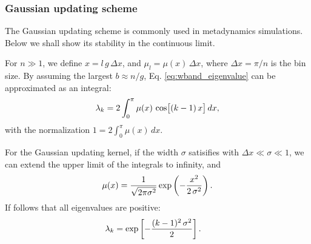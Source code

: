 \documentclass[reprint, floatfix]{revtex4-1}
\begin{document}
\subsubsection{Gaussian updating scheme}



The Gaussian updating scheme is commonly
used in metadynamics simulations.
%
Below we shall show its stability
in the continuous limit.



For $n \gg 1$,
we define
$x = l \, g \, \Delta x$,
and
$\mu_l = \mu(x) \, \Delta x$,
where
$\Delta x = \pi/n$
is the bin size.
%
By assuming the largest $b \approx n/g$,
Eq. \eqref{eq:wband_eigenvalue}
can be approximated as an integral:
%
\begin{equation}
  \lambda_k
  =
  2 \int_0^\pi
    \mu(x) \, \cos \bigl[ (k-1) \, x \bigr] \, dx,
\notag
\end{equation}
%
with the normalization
%
$
  1 = 2 \int_0^\pi \mu(x) \, dx.
$


For the Gaussian updating kernel,
if the width $\sigma$ satisifies
with $\Delta x \ll \sigma \ll 1$,
we can extend
the upper limit of the integrals
to infinity, and
%
\begin{equation}
  \mu(x)
  =
  \frac{            1            }
       { \sqrt{ 2 \pi \sigma^2 } }
  \exp\left(
        -\frac{       x^2     }
              { 2 \, \sigma^2 }
      \right)
  .
\notag
\end{equation}
%
%
If follows that all eigenvalues are positive:
%
\begin{align}
  \lambda_k
  &=
  \exp\left[
        -\frac{ (k - 1)^2 \, \sigma^2 }
              {           2           }
      \right]
  .
\notag
\end{align}
\end{document}
